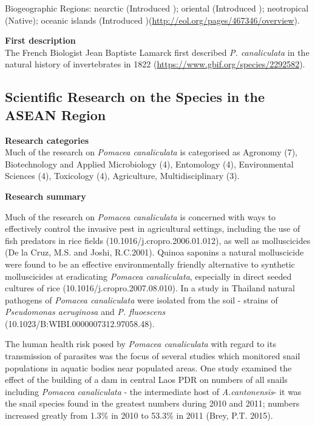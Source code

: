 \documentclass[]{book}
\theoremstyle{definition}
\theoremstyle{definition}
\theoremstyle{definition}
\theoremstyle{remark}
\begin{document}
Biogeographic Regions: nearctic (Introduced ); oriental (Introduced );
neotropical (Native); oceanic islands (Introduced
)(\url{http://eol.org/pages/467346/overview}).

\textbf{First description}\\
The French Biologist Jean Baptiste Lamarck first described \emph{P.
canaliculata} in the natural history of invertebrates in 1822
(\url{https://www.gbif.org/species/2292582}).

\hypertarget{scientific-research-on-the-species-in-the-asean-region-4}{%
\subsection{Scientific Research on the Species in the ASEAN
Region}\label{scientific-research-on-the-species-in-the-asean-region-4}}

\textbf{Research categories}\\
Much of the research on \emph{Pomacea canaliculata} is categorised as
Agronomy (7), Biotechnology and Applied Microbiology (4), Entomology
(4), Environmental Sciences (4), Toxicology (4), Agriculture,
Multidisciplinary (3).

\textbf{Research summary}

Much of the research on \emph{Pomacea canaliculata} is concerned with
ways to effectively control the invasive pest in agricultural settings,
including the use of fish predators in rice fields
(10.1016/j.cropro.2006.01.012), as well as molluscicides (De la Cruz,
M.S. and Joshi, R.C.2001). Quinoa saponins a natural molluscicide were
found to be an effective environmentally friendly alternative to
synthetic molluscicides at eradicating \emph{Pomacea canaliculata},
especially in direct seeded cultures of rice
(10.1016/j.cropro.2007.08.010). In a study in Thailand natural pathogens
of \emph{Pomacea canaliculata} were isolated from the soil - strains of
\emph{Pseudomonas aeruginosa} and \emph{P. fluoescens}
(10.1023/B:WIBI.0000007312.97058.48).

The human health risk posed by \emph{Pomacea canaliculata} with regard
to its transmission of parasites was the focus of several studies which
monitored snail populations in aquatic bodies near populated areas. One
study examined the effect of the building of a dam in central Laos PDR
on numbers of all snails including \emph{Pomacea canaliculata} - the
intermediate host of \emph{A.cantonensis}- it was the snail species
found in the greatest numbers during 2010 and 2011; numbers increased
greatly from 1.3\% in 2010 to 53.3\% in 2011 (Brey, P.T. 2015).
\end{document}
